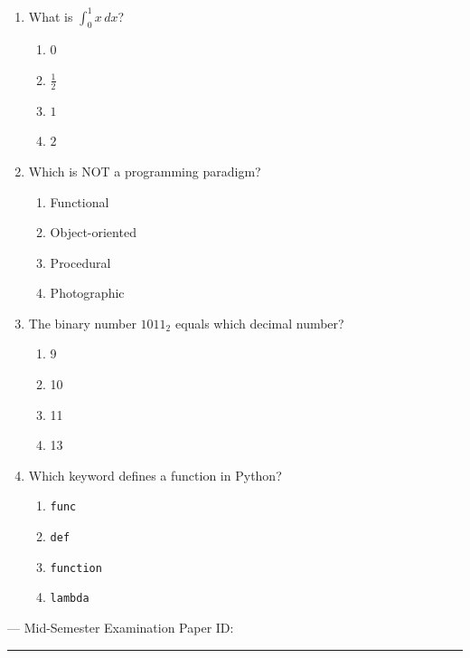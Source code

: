 \documentclass[11pt,a4paper]{article}
\begin{document}
\begin{enumerate}[label=\textbf{Q\arabic*.},leftmargin=*,itemsep=11pt,parsep=0pt,topsep=0pt]
\item What is $\int_0^1 x\,dx$?
  \begin{enumerate}[label=\textbf{\Alph*.},leftmargin=2.4em,itemsep=4pt,parsep=0pt,topsep=5pt]
  \item $0$
  \item $\tfrac{1}{2}$
  \item $1$
  \item $2$
  \end{enumerate}

\item Which is NOT a programming paradigm?
  \begin{enumerate}[label=\textbf{\Alph*.},leftmargin=2.4em,itemsep=4pt,parsep=0pt,topsep=5pt]
  \item Functional
  \item Object-oriented
  \item Procedural
  \item Photographic
  \end{enumerate}

\item The binary number $1011_2$ equals which decimal number?
  \begin{enumerate}[label=\textbf{\Alph*.},leftmargin=2.4em,itemsep=4pt,parsep=0pt,topsep=5pt]
  \item 9
  \item 10
  \item 11
  \item 13
  \end{enumerate}

\item Which keyword defines a function in Python?
  \begin{enumerate}[label=\textbf{\Alph*.},leftmargin=2.4em,itemsep=4pt,parsep=0pt,topsep=5pt]
  \item \texttt{func}
  \item \texttt{def}
  \item \texttt{function}
  \item \texttt{lambda}
  \end{enumerate}

\end{enumerate}
\restoregeometry
 --- Mid-Semester Examination%
\hfill{\small Paper ID: }

\vspace{2pt}\hrule\vspace{10pt}
\end{document}
